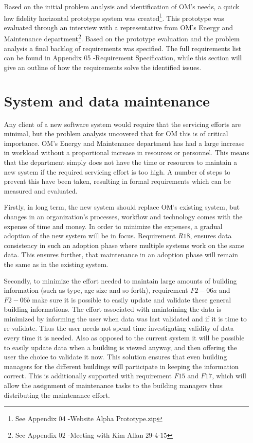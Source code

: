 Based on the initial problem analysis and identification of OM’s needs, a quick low fidelity horizontal prototype system was created\footnote{See Appendix 04 -Website Alpha Prototype.zip}. This prototype was evaluated through an interview with a representative from OM’s Energy and Maintenance department\footnote{See Appendix 02 -Meeting with Kim Allan 29-4-15}. Based on the prototype evaluation and the problem analysis a final backlog of requirements was specified. The full requirements list can be found in Appendix 05 -Requirement Specification, while this section will give an outline of how the requirements solve the identified issues.
\section{System and data maintenance}
Any client of a new software system would require that the servicing efforts are minimal, but the problem analysis uncovered that for OM this is of critical importance. OM’s Energy and Maintenance department has had a large increase in workload without a proportional increase in resources or personnel. This means that the department simply does not have the time or resources to maintain a new system if the required servicing effort is too high. A number of steps to prevent this have been taken, resulting in formal requirements which can be measured and evaluated. 

Firstly, in long term, the new system should replace OM’s existing system, but changes in an organization's processes, workflow and technology comes with the expense of time and money. In order to minimize the expenses, a gradual adoption of the new system will be in focus. Requirement $R18$, ensures data consistency in such an adoption phase where multiple systems work on the same data. This ensures further, that maintenance in an adoption phase will remain the same as in the existing system.

Secondly, to minimize the effort needed to maintain large amounts of building information (such as type, age size and so forth), requirement $F2-06a$ and $F2-06b$ make sure it is possible to easily update and validate these general building informations. The effort associated with maintaining the data is minimized by informing the user when data was last validated and if it is time to re-validate. Thus the user needs not spend time investigating validity of data every time it is needed. Also as opposed to the current system it will be possible to easily update data when a building is viewed anyway, and then offering the user the choice to validate it now. This solution ensures that even building managers for the different buildings will participate in keeping the information correct. This is additionally supported with requirement $F15$ and $F17$, which will allow the assignment of maintenance tasks to the building managers thus distributing the maintenance effort.
